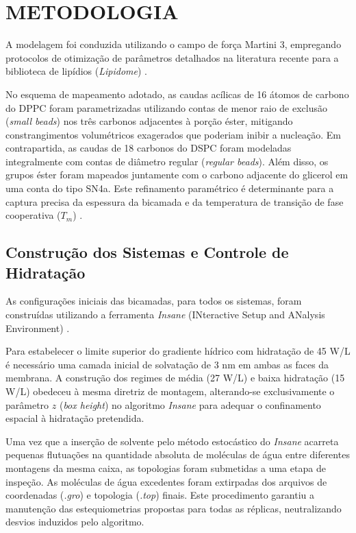 \section{METODOLOGIA}

A modelagem foi conduzida utilizando o campo de força Martini 3, empregando protocolos de otimização de parâmetros detalhados na literatura recente para a biblioteca de lipídios (\textit{Lipidome}) \cite{pedersen2025}. 

No esquema de mapeamento adotado, as caudas acílicas de 16 átomos de carbono do DPPC foram parametrizadas utilizando contas de menor raio de exclusão (\textit{small beads}) nos três carbonos adjacentes à porção éster, mitigando constrangimentos volumétricos exagerados que poderiam inibir a nucleação. Em contrapartida, as caudas de 18 carbonos do DSPC foram modeladas integralmente com contas de diâmetro regular (\textit{regular beads}). Além disso, os grupos éster foram mapeados juntamente com o carbono adjacente do glicerol em uma conta do tipo SN4a. Este refinamento paramétrico é determinante para a captura precisa da espessura da bicamada e da temperatura de transição de fase cooperativa ($T_m$) \cite{pedersen2025}.

\subsection{Construção dos Sistemas e Controle de Hidratação}

As configurações iniciais das bicamadas, para todos os sistemas, foram construídas utilizando a ferramenta \textit{Insane} (INteractive Setup and ANalysis Environment) \cite{wassenaar2015}.

Para estabelecer o limite superior do gradiente hídrico com hidratação de 45 W/L é necessário uma camada inicial de solvatação de 3 nm em ambas as faces da membrana. A construção dos regimes de média (27 W/L) e baixa hidratação (15 W/L) obedeceu à mesma diretriz de montagem, alterando-se exclusivamente o parâmetro $z$ (\textit{box height}) no algoritmo \textit{Insane} para adequar o confinamento espacial à hidratação pretendida. 

Uma vez que a inserção de solvente pelo método estocástico do \textit{Insane} acarreta pequenas flutuações na quantidade absoluta de moléculas de água entre diferentes montagens da mesma caixa, as topologias foram submetidas a uma etapa de inspeção. As moléculas de água excedentes foram extirpadas dos arquivos de coordenadas (\textit{.gro}) e topologia (\textit{.top}) finais. Este procedimento garantiu a manutenção das estequiometrias propostas para todas as réplicas, neutralizando desvios induzidos pelo algoritmo.


